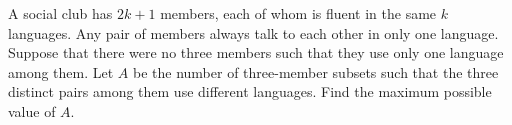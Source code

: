 A social club has $2k+1$ members, each of whom is fluent in the same $k$ languages. Any pair of members always talk to each other in only one language. Suppose that there were no three members such that they use only one language among them. Let $A$ be the number of three-member subsets such that the three distinct pairs among them use different languages. Find the maximum possible value of $A$.